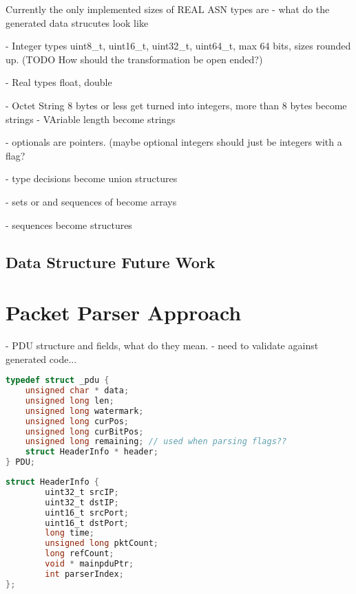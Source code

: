 \documentclass[12pt,oneside,letterpaper]{article}
\begin{document}
Currently the only implemented sizes of REAL ASN types are 
- what do the generated data strucutes look like

- Integer types  uint8\_t, uint16\_t, uint32\_t, uint64\_t, max 64 bits, sizes rounded up. (TODO How should the transformation be open ended?)

- Real types  float, double

- Octet String  8 bytes or less get turned into integers, more than 8 bytes become strings
- VAriable length become strings

- optionals are pointers. (maybe optional integers should just be integers with a flag?

- type decisions become union structures

- sets or and sequences of become arrays

- sequences become structures

\subsection{Data Structure Future Work}

\section {Packet Parser Approach}
\label{sec:ParseApproach}

- PDU structure and fields, what do they mean. - need to validate against generated code...

\noindent
\begin{minipage}{\linewidth}
\begin{lstlisting}[language=C,style=CStyle,frame=none,
caption=PDU Data Structure,label=Code:pdustruct, xleftmargin=3.5ex]
typedef struct _pdu {
    unsigned char * data;
    unsigned long len;
    unsigned long watermark;
    unsigned long curPos;
    unsigned long curBitPos;
    unsigned long remaining; // used when parsing flags??
    struct HeaderInfo * header;
} PDU;
\end{lstlisting}
\end{minipage}

\noindent
\begin{minipage}{\linewidth}
\begin{lstlisting}[language=C,style=CStyle,frame=none,
caption=HeaderInfo Data Structure,label=Code:headerstruct, xleftmargin=3.5ex]
struct HeaderInfo {
        uint32_t srcIP;
        uint32_t dstIP;
        uint16_t srcPort;
        uint16_t dstPort;
        long time;
        unsigned long pktCount;
        long refCount;
        void * mainpduPtr;
        int parserIndex;
};
\end{lstlisting}
\end{minipage}
\end{document}
